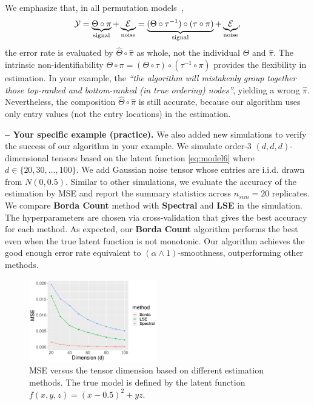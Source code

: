 \documentclass[11pt]{article}
\theoremstyle{plain}
\theoremstyle{definition}
\newcommand*{\KeepStyleUnderBrace}[1]{%
  \mathop{%
    \mathchoice
    {\underbrace{\displaystyle#1}}%
    {\underbrace{\textstyle#1}}%
    {\underbrace{\scriptstyle#1}}%
    {\underbrace{\scriptscriptstyle#1}}%
  }\limits
}
\begin{document}
\begin{enumerate}[wide, labelwidth=!, labelindent=0pt]
We emphasize that, in all permutation models~\citep{chan2014consistent,klopp2017oracle, chatterjee2015matrix,shah2019low, flammarion2019optimal,hutter2020estimation},
\[
\tY=\KeepStyleUnderBrace{\Theta \circ \pi}_{\text{signal}} + \KeepStyleUnderBrace{\tE}_{\text{noise}} =\KeepStyleUnderBrace{(\Theta \circ \tau^{-1}) \circ (\tau\circ \pi)}_{\text{signal}} + \KeepStyleUnderBrace{\tE}_{\text{noise}},
\]
the error rate is evaluated by $\hat \Theta \circ \hat \pi$ as whole, not the individual $\hat \Theta$ and $\hat \pi$. The intrinsic non-identifiability $\Theta \circ \pi =( \Theta \circ \tau) \circ (\tau^{-1} \circ \pi)$ provides the flexibility in estimation. In your example, the \emph{``the algorithm will mistakenly group together those top-ranked and bottom-ranked (in true ordering) nodes''}, yielding a wrong $\hat \pi$. Nevertheless, the composition $\hat \Theta \circ \hat \pi$ is still accurate, because our algorithm uses only entry values (not the entry locations) in the estimation. 
 
     {\bf -- Your specific example (practice).}  We also added new simulations to verify the success of our algorithm in your example. We simulate order-3 $(d,d,d)$-dimensional tensors based on the latent function \eqref{eq:model6} where $d\in\{20,30,\ldots,100\}.$ We add  Gaussian noise tensor whose entries are i.i.d. drawn from $N(0,0.5).$ Similar to other simulations, we evaluate the accuracy of the estimation by MSE and
report the summary statistics across 
$n_{sim}= 20$ replicates. We compare \textbf{Borda Count}  method with \textbf{Spectral} and \textbf{LSE} in the simulation. The hyperparameters are chosen via cross-validation that gives the best accuracy for each method. As expected, our \textbf{Borda Count} algorithm performs the best even when the true latent function is not monotonic. Our algorithm achieves the good enough error rate equivalent to $(\alpha\wedge 1)$-smoothness, outperforming other methods. 
\renewcommand{\thefigure}{R\arabic{figure}}
\setcounter{figure}{0}
\begin{figure}[H]
    \centering
    \includegraphics[width = 0.5\textwidth]{figure/model6.pdf}   
    \caption{MSE versus the tensor dimension based on different estimation methods. The true model is defined by the latent function $f(x,y,z)=(x-0.5)^2 +yz$.}
    \label{fig:method2}
\end{figure}


\end{enumerate}
\end{document}
